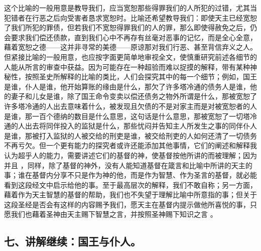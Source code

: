   这个比喻的一般用意是教导我们，应当宽恕那些得罪我们的人所犯的过错，尤其当犯错者在行恶之后向受害者恳求宽恕时。比喻还希望教导我们：即使天主已经宽恕了我们所犯的罪债，但若我们不宽恕得罪我们的人的罪，那么即使得赦免之后，仍会要求我们偿还债款，直到我们心中不再存有丝毫对恶事的记忆，而是全心全意，藉着宽恕之德——这并非寻常的美德——原谅那对我们行恶、甚至背信弃义之人。但紧接比喻的一般用意，也应按字面更简单地审视全文，使慎重研究前述各细节的人能从所言的审查中获益。因为可能存在一种超验而难以捉摸的解释，带有某种神秘性，按照圣史所解释的比喻的类比，人们会探究其中的每一个细节；例如，国王是谁，仆人是谁，他开始算账的缘由是什么，那欠了许多塔冷通的债务人是谁，他的妻子和儿女是谁，除了国王命令变卖以偿还债务之物外所谓是什么，那被宽恕了许多塔冷通的人出去意味着什么，被发现且欠债的不是对家主而是对被宽恕者的人是谁，那一百个德纳的数目是什么意思，这句话是什么意思，那被宽恕了一切塔冷通的人出去将同伴投入的监狱是什么，那些忧闷并告知主人所发生之事的同伴仆人是谁，那被打入监狱的人被交给的刑吏是谁，被交给刑吏的人如何还清了一切债务不再亏欠。但一个更有能力的探究者或许还能添加其他事情，它们的阐述和解释我认为超乎人的能力，需要讲述它们的基督的神，使基督按他所讲的而被理解；因为并且 ，同样，除了基督的神外，没有人能知道基督在箴言和比喻中所讲的天主的事；谁在基督内分享不只是作为神的他，而是作为智慧、作为圣言的基督，就必能看到这段经文中启示给他的事。至于最高层次的解释，我们不敢自称；另一方面，藉着作为天主智慧的基督的帮助，我们也不失望于理解比喻中所意指的事；但关于这段圣经是否会有这样的内容赐予我们，愿天主在基督内提示做他所喜悦的事，只愿我们也藉着圣神由天主赐下智慧之言，并按照圣神赐下知识之言 。\par


\subsection{七、讲解继续：国王与仆人。}

